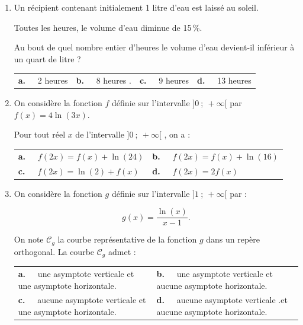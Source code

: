 \documentclass[10pt]{article}
\begin{document}
\bigskip
\begin{enumerate}
\item Un récipient contenant initialement 1 litre d'eau est laissé au soleil.

Toutes les heures, le volume d'eau diminue de 15\,\%.

Au bout de quel nombre entier d'heures le volume d'eau devient-il inférieur à un quart de litre ?

\begin{center}
\begin{tabularx}{\linewidth}{*{4}{X}}
\textbf{a.~~} 2 heures &\textbf{b.~~}  8 heures .&
\textbf{c.~~} 9 heures&\textbf{d.~~} 13 heures 
\end{tabularx}
\end{center}

\item On considère la fonction $f$ définie sur l'intervalle $]0~;~+\infty[$ par $f(x) = 4\ln (3x)$.

Pour tout réel $x$ de l'intervalle $]0~;~+\infty[$ , on a :

\begin{center}
\begin{tabularx}{\linewidth}{*{2}{X}}
\textbf{a.~~} $f(2x) = f(x) + \ln (24)$&\textbf{b.~~} $f(2x) = f(x) + \ln (16)$\\
\textbf{c.~~} $f(2x) = \ln (2) + f(x)$& \textbf{d.~~} $f(2x) = 2f(x)$
\end{tabularx}
\end{center}
\item On considère la fonction $g$ définie sur l'intervalle $]1~;~+\infty[$ par : 

\[g(x) = \dfrac{\ln (x)}{x - 1}.\]


On note $\mathcal{C}_g$ la courbe représentative de la fonction $g$ dans un repère orthogonal. La courbe $\mathcal{C}_g$ admet :

\begin{center}
\begin{tabularx}{\linewidth}{*{2}{X}}
\textbf{a.~~} une asymptote verticale
et une asymptote horizontale.&\textbf{b.~~} une asymptote verticale
et aucune asymptote horizontale.\\
\textbf{c.~~} aucune asymptote verticale et une asymptote horizontale.&\textbf{d.~~} 
aucune asymptote verticale .et aucune asymptote horizontale.
\end{tabularx}
\end{center}
\end{enumerate}
\end{document}
